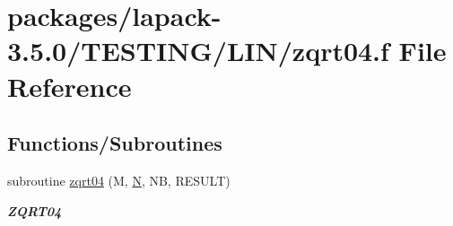 \hypertarget{zqrt04_8f}{}\section{packages/lapack-\/3.5.0/\+T\+E\+S\+T\+I\+N\+G/\+L\+I\+N/zqrt04.f File Reference}
\label{zqrt04_8f}
\subsection*{Functions/\+Subroutines}
\begin{DoxyCompactItemize}
\item 
subroutine \hyperlink{group__complex16__lin_ga7117135ef49211eded4d2518ab2438ac}{zqrt04} (M, \hyperlink{polmisc_8c_a0240ac851181b84ac374872dc5434ee4}{N}, N\+B, R\+E\+S\+U\+L\+T)
\begin{DoxyCompactList}\small\item\em {\bfseries Z\+Q\+R\+T04} \end{DoxyCompactList}\end{DoxyCompactItemize}
